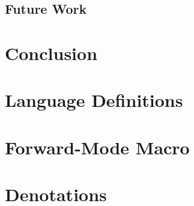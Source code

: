 \documentclass[11pt, final]{article}
\begin{document}
  \subsection{Future Work}
\section{Conclusion}

\appendix
\section{Language Definitions}
\section{Forward-Mode Macro}
\section{Denotations}
\printbibliography
\makeatother
\end{document}
